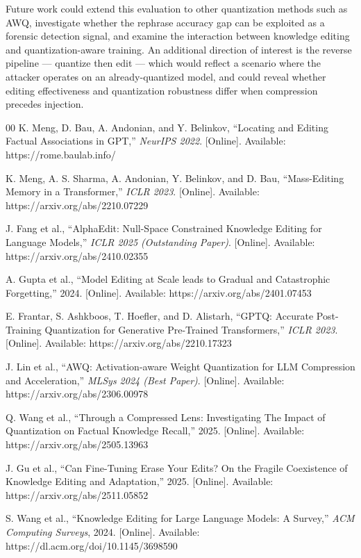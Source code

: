 \documentclass[conference]{IEEEtran}
\begin{document}
Future work could extend this evaluation to other quantization methods such as AWQ, investigate whether the rephrase accuracy gap can be exploited as a forensic detection signal, and examine the interaction between knowledge editing and quantization-aware training. An additional direction of interest is the reverse pipeline --- quantize then edit --- which would reflect a scenario where the attacker operates on an already-quantized model, and could reveal whether editing effectiveness and quantization robustness differ when compression precedes injection.

\begin{thebibliography}{00}
     K. Meng, D. Bau, A. Andonian, and Y. Belinkov, ``Locating and Editing Factual Associations in GPT,'' \textit{NeurIPS 2022}. [Online]. Available: https://rome.baulab.info/

     K. Meng, A. S. Sharma, A. Andonian, Y. Belinkov, and D. Bau, ``Mass-Editing Memory in a Transformer,'' \textit{ICLR 2023}. [Online]. Available: https://arxiv.org/abs/2210.07229

     J. Fang et al., ``AlphaEdit: Null-Space Constrained Knowledge Editing for Language Models,'' \textit{ICLR 2025 (Outstanding Paper)}. [Online]. Available: https://arxiv.org/abs/2410.02355

     A. Gupta et al., ``Model Editing at Scale leads to Gradual and Catastrophic Forgetting,'' 2024. [Online]. Available: https://arxiv.org/abs/2401.07453

     E. Frantar, S. Ashkboos, T. Hoefler, and D. Alistarh, ``GPTQ: Accurate Post-Training Quantization for Generative Pre-Trained Transformers,'' \textit{ICLR 2023}. [Online]. Available: https://arxiv.org/abs/2210.17323

     J. Lin et al., ``AWQ: Activation-aware Weight Quantization for LLM Compression and Acceleration,'' \textit{MLSys 2024 (Best Paper)}. [Online]. Available: https://arxiv.org/abs/2306.00978

     Q. Wang et al., ``Through a Compressed Lens: Investigating The Impact of Quantization on Factual Knowledge Recall,'' 2025. [Online]. Available: https://arxiv.org/abs/2505.13963

     J. Gu et al., ``Can Fine-Tuning Erase Your Edits? On the Fragile Coexistence of Knowledge Editing and Adaptation,'' 2025. [Online]. Available: https://arxiv.org/abs/2511.05852

     S. Wang et al., ``Knowledge Editing for Large Language Models: A Survey,'' \textit{ACM Computing Surveys}, 2024. [Online]. Available: https://dl.acm.org/doi/10.1145/3698590


\end{thebibliography}
\end{document}
